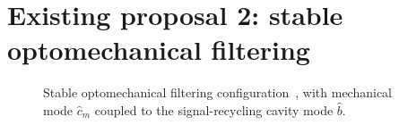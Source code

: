 \section{Existing proposal 2: stable optomechanical filtering}

\begin{figure}
	\centering
	\caption{Stable optomechanical filtering configuration~\cite{Li2021}, with mechanical mode $\hat{c}_m$ coupled to the signal-recycling cavity mode $\hat b$.}
	\label{fig:sWLC_config}
\end{figure}



